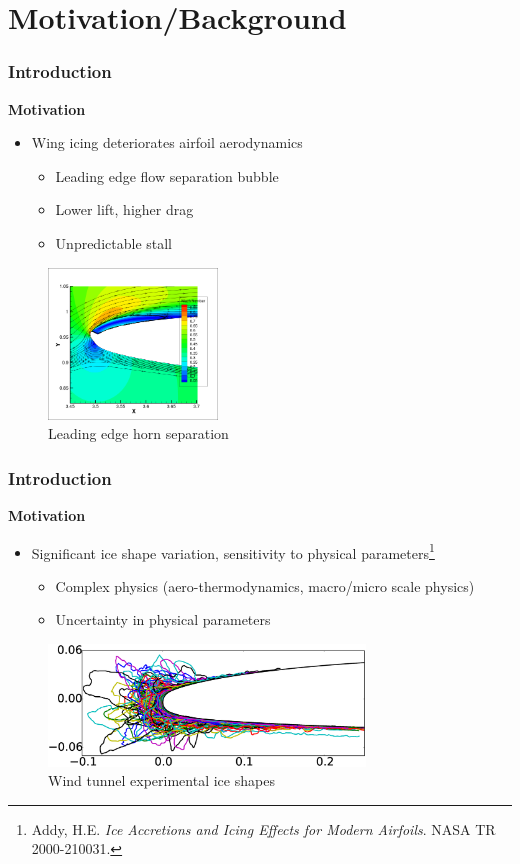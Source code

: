 \documentclass[9pt]{beamer}
\begin{document}
\section{Motivation/Background}
\label{sec-1}
\begin{frame}
\frametitle{Introduction}
\label{sec-1-1}

\textbf{Motivation}
\begin{itemize}
\item Wing icing deteriorates airfoil aerodynamics
\begin{itemize}
\item Leading edge flow separation bubble
\item Lower lift, higher drag
\item Unpredictable stall
\end{itemize}
\end{itemize}

\vspace*{-0.0cm}\begin{figure}
    \includegraphics[width=0.4\textwidth]{BadHorn.png}
    \caption{Leading edge horn separation}
\end{figure}
\end{frame}
\begin{frame}
\frametitle{Introduction}
\label{sec-1-2}

\textbf{Motivation}
\begin{itemize}
\item Significant ice shape variation, sensitivity to physical
  parameters\footnote{Addy, H.E. \emph{Ice Accretions and Icing Effects for Modern Airfoils}. NASA TR 2000-210031.
 }
\begin{itemize}
\item Complex physics (aero-thermodynamics, macro/micro scale physics)
\item Uncertainty in physical parameters
\end{itemize}
\end{itemize}

\vspace*{-0.0cm}\begin{figure}
      \includegraphics[width=0.75\textwidth]{GlobalDataSet}
      \caption{Wind tunnel experimental ice shapes}
\end{figure}
\end{frame}
\end{document}
